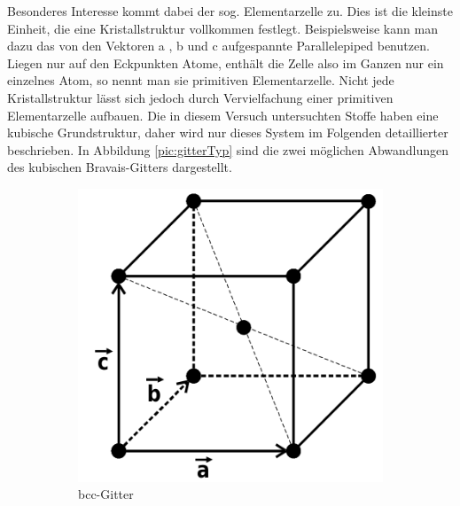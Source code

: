 Besonderes Interesse  kommt dabei der sog. Elementarzelle zu. Dies ist die kleinste Einheit, die eine Kristallstruktur vollkommen festlegt. Beispielsweise kann man dazu das von den Vektoren a , b und c aufgespannte Parallelepiped benutzen. Liegen nur auf den Eckpunkten Atome, enthält die Zelle also im Ganzen nur ein einzelnes Atom, so nennt man sie primitiven Elementarzelle. 
Nicht jede Kristallstruktur lässt sich jedoch durch Vervielfachung einer primitiven Elementarzelle aufbauen. Die in diesem Versuch untersuchten Stoffe haben eine kubische Grundstruktur, daher wird nur dieses System im Folgenden detaillierter beschrieben. In Abbildung \ref{pic:gitterTyp} sind die zwei möglichen Abwandlungen des kubischen Bravais-Gitters dargestellt.
\begin{figure}[htbp]
	\centering
	\begin{subfigure}[b]{0.3\textwidth}
		\includegraphics[width=\textwidth]{../pics/bcc.png}
		\caption{bcc-Gitter}
		\label{pic:bcc}
	\end{subfigure}
	~ %
	\begin{subfigure}[b]{0.3\textwidth}

\end{subfigure}
\end{figure}
